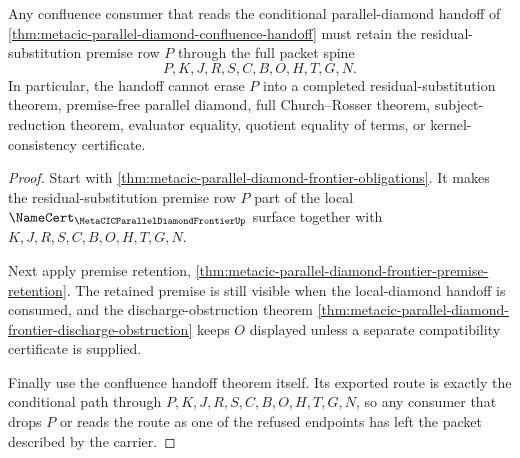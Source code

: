 \begin{theorem}
\label{thm:metacic-parallel-diamond-frontier-premise-preservation}
Any confluence consumer that reads the conditional parallel-diamond handoff of \autoref{thm:metacic-parallel-diamond-confluence-handoff} must retain the residual-substitution premise row $P$ through the full packet spine
$$
P,K,J,R,S,C,B,O,H,T,G,N .
$$
In particular, the handoff cannot erase $P$ into a completed residual-substitution theorem, premise-free parallel diamond, full Church--Rosser theorem, subject-reduction theorem, evaluator equality, quotient equality of terms, or kernel-consistency certificate.
\end{theorem}
\begin{proof}
Start with \autoref{thm:metacic-parallel-diamond-frontier-obligations}. It makes the residual-substitution premise row $P$ part of the local $\NameCert_{\MetaCICParallelDiamondFrontierUp}$ surface together with $K,J,R,S,C,B,O,H,T,G,N$.

Next apply premise retention, \autoref{thm:metacic-parallel-diamond-frontier-premise-retention}. The retained premise is still visible when the local-diamond handoff is consumed, and the discharge-obstruction theorem \autoref{thm:metacic-parallel-diamond-frontier-discharge-obstruction} keeps $O$ displayed unless a separate compatibility certificate is supplied.

Finally use the confluence handoff theorem itself. Its exported route is exactly the conditional path through $P,K,J,R,S,C,B,O,H,T,G,N$, so any consumer that drops $P$ or reads the route as one of the refused endpoints has left the packet described by the carrier.
\end{proof}

